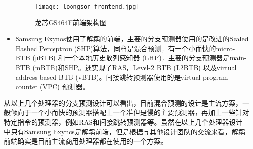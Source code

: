 \begin{itemize}[listparindent=2em]
    
    \begin{figure}[htb]
        \centering
        \setlength\tabcolsep{3pt}  %
        \vspace{5pt} %
        \texttt{[image: loongson-frontend.jpg]}
        \caption{龙芯GS464E前端架构图\cite{loongson}}
        \label{fig:figure12}
    \end{figure}
    
    \item Samsung Exynos\cite{samsung-exynos}使用了解耦的前端，主要的分支预测器使用的是改进的Scaled Hashed Perceptron (SHP)算法\cite{perceptrons,neural-branch,optimized-neural,strided-perceptron,merging-perceptron}，同样是混合预测，有一个小而快的micro-BTB (μBTB) 和一个本地历史散列感知器 (LHP)，主要的分支预测器是main-BTB (mBTB)和SHP。还实现了RAS，Level-2 BTB (L2BTB) 以及virtual address-based BTB (vBTB)。间接跳转预测器使用的是virtual program counter (VPC)\cite{vpc} 预测器。
\end{itemize}

从以上几个处理器的分支预测设计可以看出，目前混合预测的设计是主流方案，一般倾向于一个小而快的预测器搭配上一个准但是慢的主要预测器，再加上一些针对特定指令的预测器，例如RAS和间接跳转预测器等。虽然在以上几个处理器设计中只有Samsung Exynos是解耦前端，但是根据与其他设计团队的交流来看，解耦前端确实是目前主流商用处理器都在使用的一个方案。




